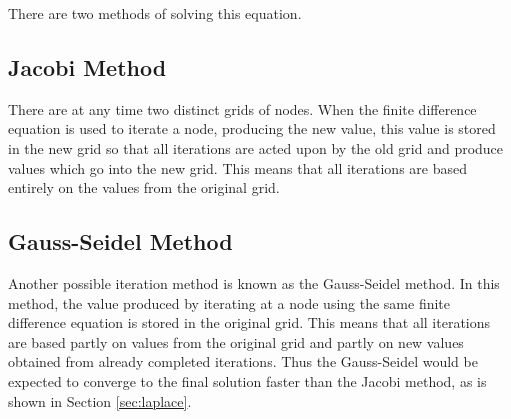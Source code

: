 There are two methods of solving this equation.

\subsection{Jacobi Method}

There are at any time two distinct grids of nodes. When the finite difference equation is used to iterate a node, producing the new value, this value is stored in the new grid so that all iterations are acted upon by the old grid and produce values which go into the new grid. This means that all iterations are based entirely on the values from the original grid.

\subsection{Gauss-Seidel Method}

Another possible iteration method is known as the Gauss-Seidel method. In this method, the value produced by iterating at a node using the same finite difference equation is stored in the original grid. This means that all iterations are based partly on values from the original grid and partly on new values obtained from already completed iterations. Thus the Gauss-Seidel would be expected to converge to the final solution faster than the Jacobi method, as is shown in Section \ref{sec:laplace}.